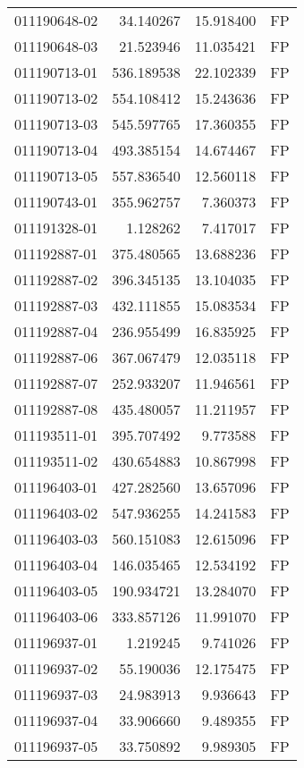 \begin{tabular}{lrrl}
011190648-02 &   34.140267 &    15.918400 &   FP \\
011190648-03 &   21.523946 &    11.035421 &   FP \\
011190713-01 &  536.189538 &    22.102339 &   FP \\
011190713-02 &  554.108412 &    15.243636 &   FP \\
011190713-03 &  545.597765 &    17.360355 &   FP \\
011190713-04 &  493.385154 &    14.674467 &   FP \\
011190713-05 &  557.836540 &    12.560118 &   FP \\
011190743-01 &  355.962757 &     7.360373 &   FP \\
011191328-01 &    1.128262 &     7.417017 &   FP \\
011192887-01 &  375.480565 &    13.688236 &   FP \\
011192887-02 &  396.345135 &    13.104035 &   FP \\
011192887-03 &  432.111855 &    15.083534 &   FP \\
011192887-04 &  236.955499 &    16.835925 &   FP \\
011192887-06 &  367.067479 &    12.035118 &   FP \\
011192887-07 &  252.933207 &    11.946561 &   FP \\
011192887-08 &  435.480057 &    11.211957 &   FP \\
011193511-01 &  395.707492 &     9.773588 &   FP \\
011193511-02 &  430.654883 &    10.867998 &   FP \\
011196403-01 &  427.282560 &    13.657096 &   FP \\
011196403-02 &  547.936255 &    14.241583 &   FP \\
011196403-03 &  560.151083 &    12.615096 &   FP \\
011196403-04 &  146.035465 &    12.534192 &   FP \\
011196403-05 &  190.934721 &    13.284070 &   FP \\
011196403-06 &  333.857126 &    11.991070 &   FP \\
011196937-01 &    1.219245 &     9.741026 &   FP \\
011196937-02 &   55.190036 &    12.175475 &   FP \\
011196937-03 &   24.983913 &     9.936643 &   FP \\
011196937-04 &   33.906660 &     9.489355 &   FP \\
011196937-05 &   33.750892 &     9.989305 &   FP \\

\end{tabular}
